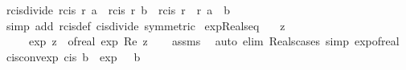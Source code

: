 \begin{isabellebody}
\endisatagproof
{\isafoldproof}%
%
\isadelimproof
\isanewline
%
\endisadelimproof
\isanewline
{}\isamarkupfalse%
\ rcis{\isacharunderscore}{\kern0pt}divide{\isacharcolon}{\kern0pt}\ {\isachardoublequoteopen}rcis\ r{}\ a\ {\isacharslash}{\kern0pt}\ rcis\ r{}\ b\ {\isacharequal}{\kern0pt}\ rcis\ {\isacharparenleft}{\kern0pt}r{}\ {\isacharslash}{\kern0pt}\ r{}{\isacharparenright}{\kern0pt}\ {\isacharparenleft}{\kern0pt}a\ {\isacharminus}{\kern0pt}\ b{\isacharparenright}{\kern0pt}{\isachardoublequoteclose}\isanewline
%
\isadelimproof
\ \ %
\endisadelimproof
%
\isatagproof
{}\isamarkupfalse%
\ {\isacharparenleft}{\kern0pt}simp\ add{\isacharcolon}{\kern0pt}\ rcis{\isacharunderscore}{\kern0pt}def\ cis{\isacharunderscore}{\kern0pt}divide\ {\isacharbrackleft}{\kern0pt}symmetric{\isacharbrackright}{\kern0pt}{\isacharparenright}{\kern0pt}%
\endisatagproof
{\isafoldproof}%
%
\isadelimproof
%
\endisadelimproof
%
\isadelimdocument
%
\endisadelimdocument
%
\isatagdocument
%
\isamarkuptrue%
%
\endisatagdocument
{\isafolddocument}%
%
\isadelimdocument
%
\endisadelimdocument
{}\isamarkupfalse%
\ exp{\isacharunderscore}{\kern0pt}Reals{\isacharunderscore}{\kern0pt}eq{\isacharcolon}{\kern0pt}\isanewline
\ \ \ {\isachardoublequoteopen}z\ {\isasymin}\ {\isasymreal}{\isachardoublequoteclose}\isanewline
\ \ \ \ \ {\isachardoublequoteopen}exp\ z\ {\isacharequal}{\kern0pt}\ of{\isacharunderscore}{\kern0pt}real\ {\isacharparenleft}{\kern0pt}exp\ {\isacharparenleft}{\kern0pt}Re\ z{\isacharparenright}{\kern0pt}{\isacharparenright}{\kern0pt}{\isachardoublequoteclose}\isanewline
%
\isadelimproof
\ \ %
\endisadelimproof
%
\isatagproof
{}\isamarkupfalse%
\ assms\ \isamarkupfalse%
\ {\isacharparenleft}{\kern0pt}auto\ elim{\isacharbang}{\kern0pt}{\isacharcolon}{\kern0pt}\ Reals{\isacharunderscore}{\kern0pt}cases\ simp{\isacharcolon}{\kern0pt}\ exp{\isacharunderscore}{\kern0pt}of{\isacharunderscore}{\kern0pt}real{\isacharparenright}{\kern0pt}%
\endisatagproof
{\isafoldproof}%
%
\isadelimproof
\isanewline
%
\endisadelimproof
\isanewline
{}\isamarkupfalse%
\ cis{\isacharunderscore}{\kern0pt}conv{\isacharunderscore}{\kern0pt}exp{\isacharcolon}{\kern0pt}\ {\isachardoublequoteopen}cis\ b\ {\isacharequal}{\kern0pt}\ exp\ {\isacharparenleft}{\kern0pt}{\isasymi}\ {\isacharasterisk}{\kern0pt}\ b{\isacharparenright}{\kern0pt}{\isachardoublequoteclose}\isanewline
%
\isadelimproof

\end{isabellebody}
